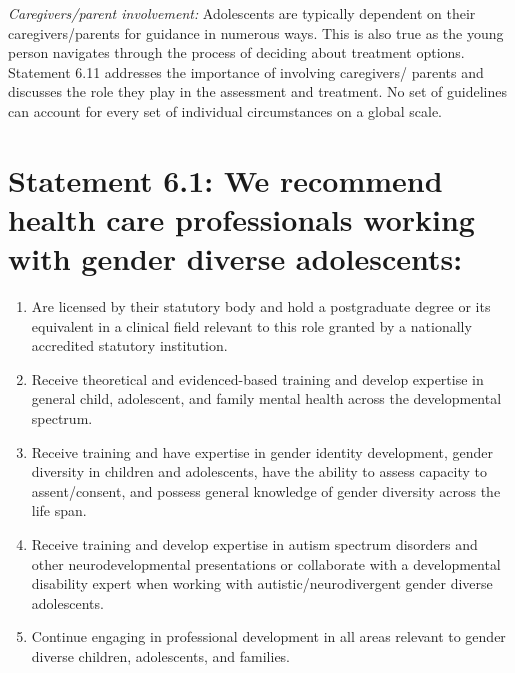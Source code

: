 \documentclass[
]{book}
\providecommand{\tightlist}{%
  \setlength{\itemsep}{0pt}\setlength{\parskip}{0pt}}
\begin{document}
\emph{Caregivers/parent involvement:} Adolescents are typically dependent on their caregivers/parents for
guidance in numerous ways. This is also true as
the young person navigates through the process of
deciding about treatment options. Statement 6.11
addresses the importance of involving caregivers/
parents and discusses the role they play in the
assessment and treatment. No set of guidelines can
account for every set of individual circumstances
on a global scale.

\hypertarget{statement-6.1-we-recommend-health-care-professionals-working-with-gender-diverse-adolescents}{%
\section*{Statement 6.1: We recommend health care professionals working with gender diverse adolescents:}\label{statement-6.1-we-recommend-health-care-professionals-working-with-gender-diverse-adolescents}}

\begin{enumerate}
\def\labelenumi{\alph{enumi}.}
\tightlist
\item
  Are licensed by their statutory body and hold a postgraduate degree or its equivalent in a clinical field relevant to this role granted by a nationally accredited statutory institution.
\item
  Receive theoretical and evidenced-based training and develop expertise in general child, adolescent, and family mental health across the developmental spectrum.
\item
  Receive training and have expertise in gender identity development, gender diversity in children and adolescents, have the ability to assess capacity to assent/consent, and possess general knowledge of gender diversity across the life span.
\item
  Receive training and develop expertise in autism spectrum disorders and other neurodevelopmental presentations or collaborate with a developmental disability expert when working with autistic/neurodivergent gender diverse adolescents.
\item
  Continue engaging in professional development in all areas relevant to gender diverse children, adolescents, and families.
\end{enumerate}
\end{document}
